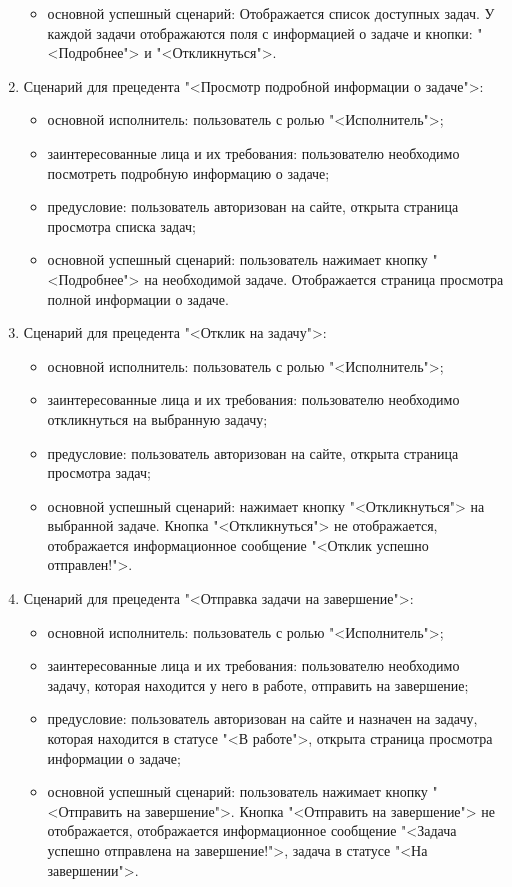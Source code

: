 \begin{enumerate}
\begin{itemize}
		\item основной успешный сценарий: Отображается список доступных задач. У каждой задачи отображаются поля с информацией о задаче и кнопки: "<Подробнее"> и "<Откликнуться">.
	\end{itemize}
\item Сценарий для прецедента "<Просмотр подробной информации о задаче">:
	\begin{itemize}
		\item основной исполнитель: пользователь с ролью "<Исполнитель">;
		\item заинтересованные лица и их требования: пользователю необходимо посмотреть подробную информацию о задаче;
		\item предусловие: пользователь авторизован на сайте, открыта страница просмотра списка задач;
		\item основной успешный сценарий: пользователь нажимает кнопку "<Подробнее"> на необходимой задаче. Отображается страница просмотра полной информации о задаче.
	\end{itemize}
\item Сценарий для прецедента "<Отклик на задачу">:
	\begin{itemize}
		\item основной исполнитель: пользователь с ролью "<Исполнитель">;
		\item заинтересованные лица и их требования: пользователю необходимо откликнуться на выбранную задачу;
		\item предусловие: пользователь авторизован на сайте, открыта страница просмотра задач;
		\item основной успешный сценарий: нажимает кнопку "<Откликнуться"> на выбранной задаче. Кнопка "<Откликнуться"> не отображается, отображается информационное сообщение "<Отклик успешно отправлен!">.
	\end{itemize}
\item Сценарий для прецедента "<Отправка задачи на завершение">:
	\begin{itemize}
		\item основной исполнитель: пользователь с ролью "<Исполнитель">;
		\item заинтересованные лица и их требования: пользователю необходимо задачу, которая находится у него в работе, отправить на завершение;
		\item предусловие: пользователь авторизован на сайте и назначен на задачу, которая находится в статусе "<В работе">, открыта страница просмотра информации о задаче;
		\item основной успешный сценарий: пользователь нажимает кнопку "<Отправить на завершение">. Кнопка "<Отправить на завершение"> не отображается, отображается информационное сообщение "<Задача успешно отправлена на завершение!">, задача в статусе "<На завершении">.

\end{itemize}
\end{enumerate}

